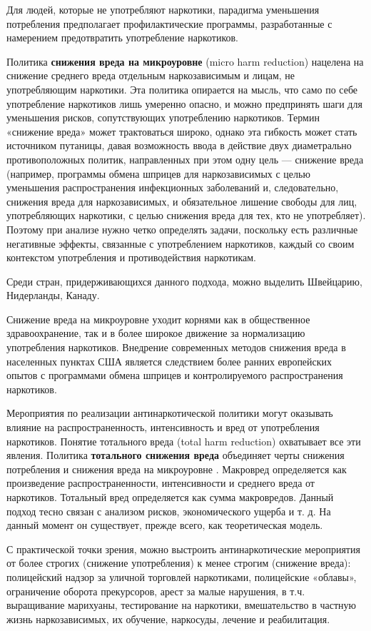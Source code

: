 \documentclass[a4paper,14pt]{article}
\begin{document}
Для людей, которые не употребляют наркотики, парадигма уменьшения потребления предполагает профилактические программы, разработанные с намерением предотвратить употребление наркотиков.

Политика \textbf{снижения вреда на микроуровне} (micro harm reduction) нацелена на снижение среднего вреда отдельным наркозависимым и лицам, не употребляющим наркотики. Эта политика опирается на мысль, что само по себе употребление наркотиков лишь умеренно опасно, и можно предпринять шаги для уменьшения рисков, сопутствующих употреблению наркотиков. Термин «снижение вреда» может трактоваться широко, однако эта гибкость может стать источником путаницы, давая возможность ввода в действие двух диаметрально противоположных политик, направленных при этом одну цель — снижение вреда (например, программы обмена шприцев для наркозависимых с целью уменьшения распространения инфекционных заболеваний и, следовательно, снижения вреда для наркозависимых, и обязательное лишение свободы для лиц, употребляющих наркотики, с целью снижения вреда для тех, кто не употребляет). Поэтому при анализе нужно четко определять задачи, поскольку есть различные негативные эффекты, связанные с употреблением наркотиков, каждый со своим контекстом употребления и противодействия наркотикам.

Среди стран, придерживающихся данного подхода, можно выделить Швейцарию, Нидерланды, Канаду.
 
Снижение вреда на микроуровне уходит корнями как в общественное здравоохранение, так и в более широкое движение за нормализацию употребления наркотиков. Внедрение современных методов снижения вреда в населенных пунктах США является следствием более ранних европейских опытов с программами обмена шприцев и контролируемого распространения наркотиков. 

Мероприятия по реализации антинаркотической политики могут оказывать влияние на распространенность, интенсивность и вред от употребления наркотиков. Понятие тотального вреда (total harm reduction) охватывает все эти явления. Политика \textbf{тотального снижения вреда} объединяет черты снижения потребления и снижения вреда на микроуровне \cite{MacCoun2001}. Макровред определяется как произведение  распространенности, интенсивности и среднего вреда от наркотиков. Тотальный вред определяется как сумма макровредов. Данный подход тесно связан с анализом рисков, экономического ущерба и т. д. На данный момент он существует, прежде всего, как теоретическая модель. 

С практической точки зрения, можно выстроить антинаркотические мероприятия от более строгих (снижение употребления) к менее строгим (снижение вреда): полицейский надзор за уличной торговлей наркотиками, полицейские «облавы», ограничение оборота прекурсоров, арест за малые нарушения, в т.ч. выращивание марихуаны, тестирование на наркотики, вмешательство в частную жизнь наркозависимых, их обучение, наркосуды, лечение и реабилитация.
\end{document}
